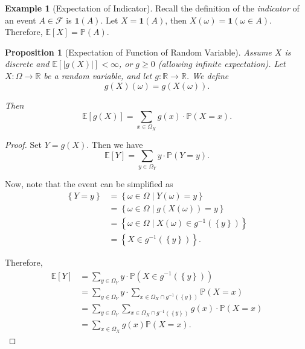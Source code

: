 \documentclass[11pt]{article}
\numberwithin{equation}{section}
\newtheorem{proposition}[theorem]{Proposition}
\theoremstyle{definition}
\newtheorem{example}[theorem]{Example}
\theoremstyle{remark}
\newcommand{\pqty}[1]{\left(#1\right)}
\newcommand{\bqty}[1]{\left[#1\right]}
\newcommand{\Bqty}[1]{\left\{#1\right\}}
\newcommand{\set}[2]{\left\{#1\mid #2\right\}}
\newcommand{\functiondomain}[3]{#1:#2\to #3}
\newcommand{\RR}{\mathbb R}
\newcommand{\inverse}{^{-1}}
\newcommand{\indicator}{\mathbf 1}
\newcommand{\eventSpace}{\mathcal F}
\newcommand{\Prob}{\mathbb P}
\newcommand{\Expt}{\mathbb E}
\begin{document}
\begin{example}[Expectation of Indicator]\label{probability-example-022}
    \label{probability-ex:expectation-indicator}%
    Recall the definition of the \emph{indicator} of an event \(A \in \eventSpace\) is \(\indicator\pqty{A}\). Let \(X = \indicator\pqty{A}\), then \(X\pqty{\omega} = \indicator\pqty{\omega \in A}\). Therefore, \(\Expt\bqty{X} = \Prob\pqty{A}\).
\end{example}

\begin{proposition}[Expectation of Function of Random Variable]\label{probability-proposition-008}
    \label{probability-prop:expectation-function-random-variable}%
Assume \(X\) is discrete and \(\Expt[|g(X)|]<\infty\), or \(g\ge0\) (allowing infinite expectation).
    Let \(\functiondomain{X}{\Omega}{\RR}\) be a random variable, and let \(\functiondomain{g}{\RR}{\RR}\). We define
    \[
        g\pqty{X} \pqty{\omega} = g\pqty{X\pqty{\omega}}.
    \]

    Then
    \[
        \Expt\bqty{g\pqty{X}} = \sum_{x \in \Omega_X} g\pqty{x} \cdot \Prob\pqty{X = x}.
    \]
\end{proposition}

\begin{proof}\label{probability-proof-018}
    Set \(Y = g\pqty{X}\). Then we have
    \[
        \Expt\bqty{Y} = \sum_{y \in \Omega_Y} y \cdot \Prob\pqty{Y = y}.
    \]

    Now, note that the event can be simplified as
    \begin{align*}
        \Bqty{Y = y} &= \set{\omega \in \Omega}{Y \pqty{\omega} = y} \\
        &= \set{\omega \in \Omega}{g\pqty{X\pqty{\omega}} = y} \\
        &= \set{\omega \in \Omega}{X\pqty{\omega} \in g\inverse \pqty{\Bqty{y}}} \\
        &= \Bqty{X \in g\inverse \pqty{\Bqty{y}}}.
    \end{align*}

    Therefore,
    \begin{align*}
        \Expt\bqty{Y} &= \sum_{y \in \Omega_Y} y \cdot \Prob\pqty{X \in g\inverse\pqty{\Bqty{y}}} \\
        &= \sum_{y \in \Omega_Y} y \cdot \sum_{x \in \Omega_X\cap g\inverse\pqty{\Bqty{y}}} \Prob\pqty{X = x} \\
        &= \sum_{y \in \Omega_Y} \sum_{x \in \Omega_X\cap g\inverse\pqty{\Bqty{y}}} g\pqty{x} \cdot \Prob\pqty{X = x} \\
        &= \sum_{x \in \Omega_X} g\pqty{x} \Prob\pqty{X = x}.
    \end{align*}
\end{proof}
\end{document}
